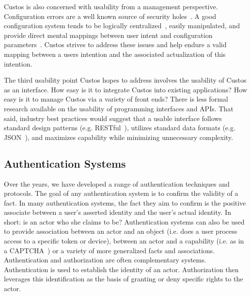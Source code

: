 Custos is also concerned with usability from a management
perspective. Configuration errors are a well known source of security
holes~\cite{Bishop1996, kerravala2002configuration}. A good
configuration system tends to be logically
centralized~\cite{Casado2007}, easily manipulated, and provide direct
mental mappings between user intent and configuration
parameters~\cite{norman2002design}. Custos strives to address these
issues and help endure a valid mapping between a users intention and
the associated actualization of this intention.

The third usability point Custos hopes to address involves the
usability of Custos as an interface. How easy is it to integrate
Custos into existing applications? How easy is it to manage Custos via
a variety of front ends? There is less formal research available on
the usability of programming interfaces and APIs. That said, industry
best practices would suggest that a usable interface follows standard
design patterns (e.g. RESTful~\cite{ibm-restful}), utilizes standard
data formats (e.g. JSON~\cite{json}), and maximizes capability while
minimizing unnecessary complexity.

\subsection{Authentication Systems}

Over the years, we have developed a range of authentication techniques
and protocols. The goal of any authentication system is to confirm the
validity of a fact. In many authentication systems, the fact they aim
to confirm is the positive associate between a user's asserted
identity and the user's actual identity. In short: is an actor who she
claims to be? Authentication systems can also be used to provide
association between an actor and an object (i.e. does a user process
access to a specific token or device), between an actor and a
capability (i.e. as in a CAPTCHA~\cite{captcha}) or a variety of more
generalized facts and associations. Authentication and authorization
are often complementary systems. Authentication is used to establish
the identity of an actor. Authorization then leverages this
identification as the basis of granting or deny specific rights to the
actor.

